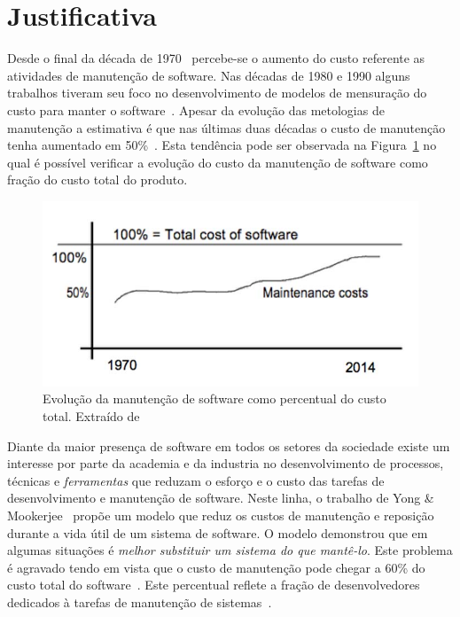 \section{Justificativa}
\label{sec:intro-justificativa}
Desde o final da década de 1970~\cite{Zelkowitz:1979:PSE:578504} percebe-se o aumento do custo
referente as atividades de  manutenção de software. Nas décadas de 1980 e 1990 alguns trabalhos
tiveram seu foco no desenvolvimento de modelos de mensuração do custo para manter o
software~\cite{Herrin:1985:SMC:323287.323383,hirota1994approach}. Apesar da evolução das metologias
de manutenção a estimativa é que nas últimas duas décadas o custo de manutenção tenha aumentado em
50\%~\cite{koskinen2010software}. Esta tendência pode ser observada na
Figura~\ref{fig:software-maintence-costs} no qual é possível verificar a evolução do custo da
manutenção de software como fração do custo total do produto.

\begin{figure}
\centering
\includegraphics[width=0.7\linewidth]{./chapter-intro/img/software-maintence-costs}
\caption{Evolução da manutenção de software como percentual do custo total.	Extraído de~\cite{engelbertink2010save}}
\label{fig:software-maintence-costs}
\end{figure}

Diante da maior presença de software em todos os setores da sociedade
existe um interesse por parte da academia e da industria no desenvolvimento de
processos, técnicas e \textit{ferramentas} que reduzam o esforço e o custo das tarefas
de desenvolvimento e manutenção de software. Neste linha, o trabalho de Yong \& Mookerjee~\cite{1423995}  propõe um modelo que reduz os custos de manutenção e reposição durante a vida útil de um sistema de software. O modelo demonstrou que em algumas situações é \textit{melhor substituir um sistema do que mantê-lo}. Este problema é agravado tendo em vista que o custo de manutenção pode chegar a 60\% do custo total do software~\cite{kaur2015review}. Este percentual reflete a fração de desenvolvedores dedicados à tarefas de manutenção de sistemas~\cite{Zhang_2003}.

